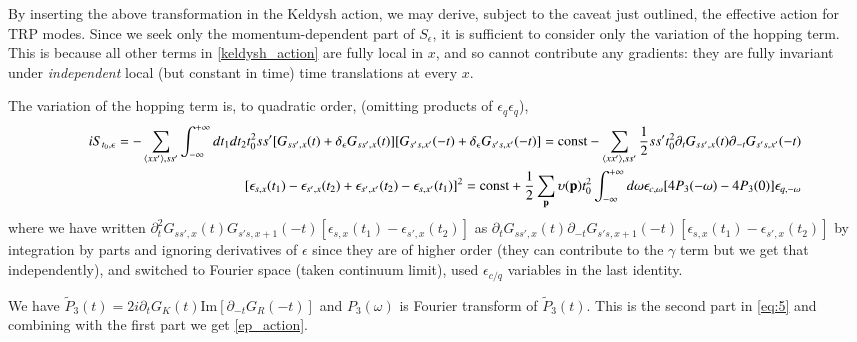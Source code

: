 \documentclass[twocolumn,floatfix,superscriptaddress]{revtex4-1}
\newcommand{\ket}{\rangle}
\newcommand{\bra}{\langle}
\newcommand{\pkpr}{P_3}
\newcommand{\pkr}{P_2}
\newcommand{\kr}{P_1}
\begin{document}
\begin{widetext}
By inserting the above transformation in the Keldysh action, we may derive, subject to the caveat just outlined, the effective action for TRP modes.   Since we seek only the momentum-dependent part of $S_\epsilon$, it is sufficient to consider only the variation of the hopping term.  This is because all other terms in \eqref{keldysh_action} are fully local in $x$, and so cannot contribute any gradients: they are fully invariant under {\em independent} local (but constant in time) time translations at every $x$.  

The variation of the hopping term is, to quadratic order, (omitting products of $\epsilon_q\epsilon_q$),
 \begin{eqnarray}
 \label{rep_action_hopping}
 &&iS_{t_0,\epsilon}=-\sum_{\bra xx'\ket,ss'}\int_{-\infty}^{+\infty} dt_1dt_2 t_0^2 ss' [G_{ss',x}(t)+\delta_\epsilon G_{ss',x}(t)][G_{s's,x'}(-t)+\delta_\epsilon G_{s's,x'}(-t)]=\text{const}-\sum_{\bra xx'\ket,ss'}\frac{1}{2}ss't_0^2\partial_t G_{ss',x}(t)\partial_{-t}G_{s's,x'}(-t)\nonumber\\
 &&[\epsilon_{s,x}(t_1)-\epsilon_{s',x}(t_2)+\epsilon_{s',x'}(t_2)-\epsilon_{s,x'}(t_1)]^2=\text{const}+\frac{1}{2}\sum_{{\bf p}} \upsilon({\bf p})t_0^2\int _{-\infty}^{+\infty}d\omega \epsilon_{c,\omega} [4\pkpr(-\omega)-4\pkpr(0)]\epsilon_{q,-\omega}
 \end{eqnarray}
 where we have written $\partial_t^2G_{ss',x}(t) G_{s's,x+1}(-t) [\epsilon_{s,x}(t_1)-\epsilon_{s',x}(t_2)]$ as $\partial_tG_{ss',x}(t)\partial_{-t} G_{s's,x+1}(-t) [\epsilon_{s,x}(t_1)-\epsilon_{s',x}(t_2)]$ by integration by parts and ignoring derivatives of $\epsilon$ since they are of higher order (they can contribute to the $\gamma$ term but we get that independently), and switched to Fourier space (taken continuum limit), used $\epsilon_{c/q}$ variables in the last identity. 
 
 We have
$\tilde\pkpr(t)=2i\partial_tG_K(t)\text{Im}[\partial_{-t}G_R(-t)] $
and $P_{3}(\omega)$ is Fourier transform of $\tilde P_{3}(t)$. This is the second part in \eqref{eq:5} and combining with the first part we get \eqref{ep_action}.
 

\end{widetext}
\end{document}
